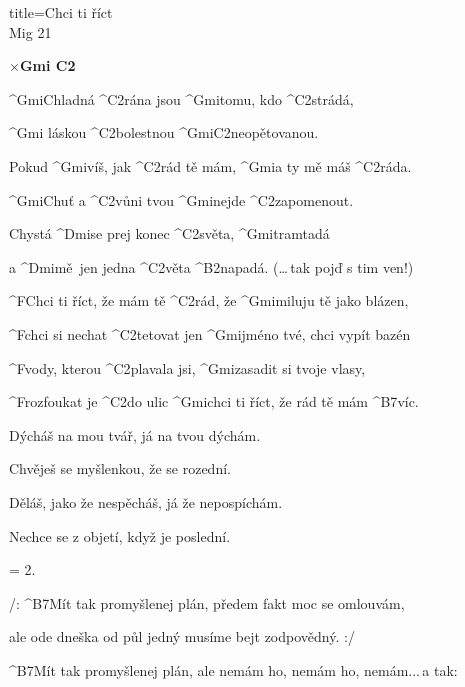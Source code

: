 \begin{song}{title=\predtitle\centering Chci ti říct \\\large Mig 21  \vspace*{-0.3cm}}  %
\begin{centerjustified}


$\times $\textbf{Gmi C2}

\sloka
	^{Gmi}Chladná ^{C2}rána jsou ^{Gmi}tomu, kdo ^{C2}strádá,

	^{Gmi\,\,}láskou ^{C2\z }bolestnou ^{Gmi\z C2}neopětovanou.

	Pokud ^{Gmi}víš, jak ^{C2}rád tě mám, ^{Gmi}a ty mě máš ^{C2}ráda.

	^{Gmi}Chuť a ^{C2}vůni tvou ^{Gmi}nejde ^{C2\z }zapomenout.

\sloka
	Chystá ^{Dmi}se prej konec ^{C2}světa, ^{Gmi}tramtadá

	a ^{Dmi\z}mě~jen jedna ^{C2}věta ^{\z B2}napadá. (\dots\,tak pojď s tim ven!)

	^{F}Chci ti říct, že mám tě ^{C2}rád, že ^{Gmi}miluju tě jako blázen,

	^{F}chci si nechat ^{C2\z }tetovat jen ^{Gmi}jméno tvé, chci vypít bazén

	^{F}vody, kterou ^{C2\z }plavala jsi, ^{Gmi\z }zasadit si tvoje vlasy,

	^{F\z }rozfoukat je ^{C2}do ulic ^{Gmi}chci ti říct, že rád tě mám ^{B7}víc.

\sloka
	Dýcháš na mou tvář, já na tvou dýchám.

	Chvěješ se myšlenkou, že se rozední.

	Děláš, jako že nespěcháš, já že nepospíchám.

	Nechce se z objetí, když je poslední.

\sloka  = 2.



\sloka
	/: ^{B7}Mít tak promyšlenej plán, předem fakt moc se omlouvám, 

	ale ode dneška od půl jedný musíme bejt zodpovědný. :/

	^{B7}Mít tak promyšlenej plán, ale nemám ho, nemám ho, nemám\elipsa.\elipsa.\elipsa.\,a tak:



\end{centerjustified}
\setcounter{Slokočet}{0}
\end{song}
